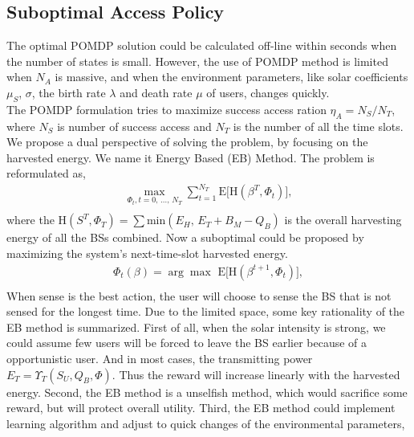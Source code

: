 \documentclass[conference]{IEEEtran}
\begin{document}
\subsection{Suboptimal Access Policy}
The optimal POMDP solution could be calculated off-line within seconds when the number of states is small.
However, the use of POMDP method is limited when \(N_A\) is massive,
and when the environment parameters, like solar coefficients \(\mu_S\), \(\sigma\),
the birth rate \(\lambda\) and death rate \(\mu\) of users, changes quickly.\\
The POMDP formulation tries to maximize success access ration \(\eta_A = N_S/N_T\),
where \(N_S\) is number of success access and \(N_T\) is the number of all the time slots.
We propose a dual perspective of solving the problem, by focusing on the harvested energy.
We name it Energy Based (EB) Method.
The problem is reformulated as,
\begin{equation}
\begin{aligned}
	\underset{\Phi_t,t=0,\,\ldots,\,N_T}{\max}\sum\nolimits_{t=1}^{N_T}
	\mbox{E}\lbrack\mbox{H}\left(\beta^T, \Phi_t\right)\rbrack,\\
\end{aligned}
\end{equation}
where the \(\mbox{H}\left(S^T, \Phi_T\right) = \sum\mbox{min}\left(E_H,\,E_T+B_M-Q_B\right)\)
is the overall harvesting energy of all the BSs combined.
Now a suboptimal could be proposed by maximizing the system's next-time-slot harvested energy.
\begin{equation}
\begin{aligned}
	\Phi_t\left(\beta\right) = \arg{\max}\,\,\mbox{E}\lbrack\mbox{H}(\beta^{t+1}, \Phi_t)\rbrack,\\
\end{aligned}
\end{equation}
When sense is the best action, the user will choose to sense the BS that is not sensed for the longest time.
Due to the limited space, some key rationality of the EB method is summarized.
First of all, when the solar intensity is strong,
we could assume few users will be forced to leave the BS earlier because of a opportunistic user.
And in most cases, the transmitting power \(E_T = \Upsilon_T(S_U, Q_B, \Phi)\).
Thus the reward will increase linearly with the harvested energy.
Second, the EB method is a unselfish method, which would sacrifice some reward,
but will protect overall utility.
Third, the EB method could implement learning algorithm and adjust to quick changes of the environmental parameters,
\end{document}
